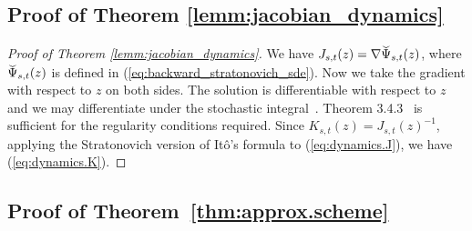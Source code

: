 \documentclass[twoside]{article}
\begin{document}
\subsection{Proof of Theorem \ref{lemm:jacobian_dynamics}}
\begin{proof}[Proof of Theorem \ref{lemm:jacobian_dynamics}]
\label{app:jacobian_dynamics}
We have $J_{s, t}(z) = \nabla \widecheck{\Psi}_{s, t}(z)$, where $\widecheck{\Psi}_{s, t}(z)$ is defined in (\ref{eq:backward_stratonovich_sde}).
Now we take the gradient with respect to $z$ on both sides. The solution is differentiable with respect to $z$ and we may differentiate under the stochastic integral~\cite[Proposition 2.4.3]{kunita2019stochastic}. 
Theorem 3.4.3~\cite{kunita2019stochastic} is sufficient for the regularity conditions required.
Since $K_{s, t}(z) = J_{s, t}(z)^{-1}$, applying the Stratonovich version of It\^{o}'s formula to (\ref{eq:dynamics.J}), we have (\ref{eq:dynamics.K}).
\end{proof}
 \subsection{Proof of Theorem~\ref{thm:approx.scheme}}\label{app:approx.scheme}
\end{document}
